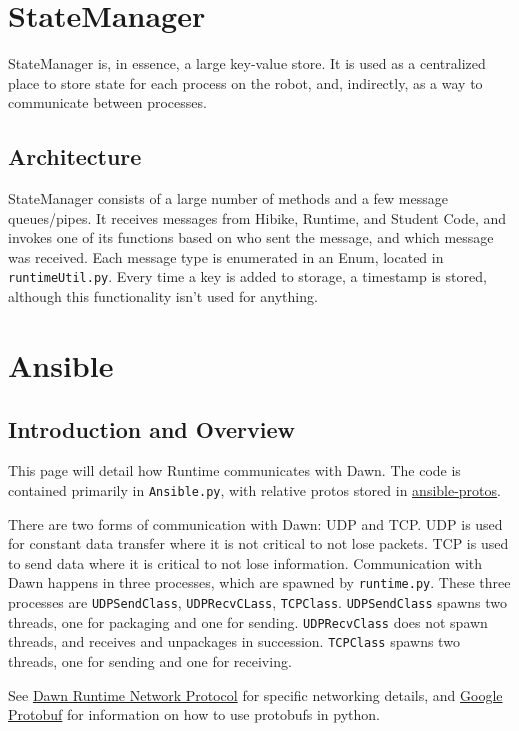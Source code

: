 \documentclass[12pt]{book}
\begin{document}
\section{StateManager}
StateManager is, in essence, a large key-value store. It is used as
a centralized place to store state for each process on the robot,
and, indirectly, as a way to communicate between processes.

\subsection{Architecture}
StateManager consists of a large number of methods and a few message queues/pipes.
It receives messages from Hibike, Runtime, and Student Code, and invokes
one of its functions based on who sent the message, and which message
was received. Each message type is enumerated in an Enum, located in
\texttt{runtimeUtil.py}. Every time a key is added to storage,
a timestamp is stored, although this functionality isn't used for anything.

\section{Ansible}
\subsection{Introduction and Overview}\label{introduction-and-overview}

This page will detail how Runtime communicates with Dawn. The code is
contained primarily in \texttt{Ansible.py}, with relative protos stored
in
\href{https://github.com/pioneers/PieCentral/tree/master/ansible-protos}{ansible-protos}.

There are two forms of communication with Dawn: UDP and TCP. UDP is used
for constant data transfer where it is not critical to not lose packets.
TCP is used to send data where it is critical to not lose information.
Communication with Dawn happens in three processes, which are spawned by
\texttt{runtime.py}. These three processes are \texttt{UDPSendClass},
\texttt{UDPRecvCLass}, \texttt{TCPClass}. \texttt{UDPSendClass} spawns
two threads, one for packaging and one for sending.
\texttt{UDPRecvClass} does not spawn threads, and receives and
unpackages in succession. \texttt{TCPClass} spawns two threads, one for
sending and one for receiving.

See \href{https://github.com/pioneers/PieCentral/wiki/Dawn-Runtime-Network-Protocol}{Dawn Runtime Network Protocol}
for specific networking details, and
\href{https://developers.google.com/protocol-buffers/docs/pythontutorial}{Google
Protobuf} for information on how to use protobufs in python.
\end{document}
